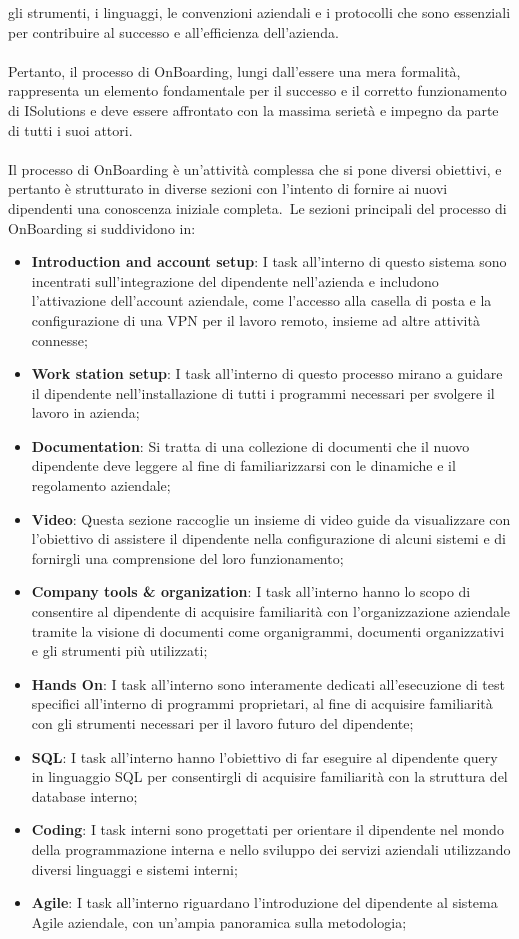gli strumenti, i linguaggi, le convenzioni aziendali e i protocolli che sono essenziali per contribuire al successo e 
all'efficienza dell'azienda.
\\ \\
Pertanto, il processo di OnBoarding, lungi dall'essere una mera formalità, rappresenta un elemento fondamentale per il successo 
e il corretto funzionamento di ISolutions e deve essere affrontato con la massima serietà e impegno da parte di tutti i suoi attori.
\\ \\
Il processo di OnBoarding è un'attività complessa che si pone diversi obiettivi, 
e pertanto è strutturato in diverse sezioni con l'intento di fornire ai nuovi 
dipendenti una conoscenza iniziale completa.\ Le sezioni principali del processo di OnBoarding si suddividono in:
\begin{itemize}
    \item \textbf{Introduction and account setup}: I task all'interno di questo sistema sono incentrati sull'integrazione del dipendente 
    nell'azienda e includono l'attivazione dell'account aziendale, come l'accesso alla casella di posta e la configurazione di una VPN per 
    il lavoro remoto, insieme ad altre attività connesse;
    \item \textbf{Work station setup}: I task all'interno di questo processo mirano a guidare il dipendente nell'installazione di tutti 
    i programmi necessari per svolgere il lavoro in azienda;
    \item \textbf{Documentation}: Si tratta di una collezione di documenti che il nuovo dipendente deve leggere al fine di familiarizzarsi 
    con le dinamiche e il regolamento aziendale;
    \item \textbf{Video}: Questa sezione raccoglie un insieme di video guide da visualizzare con l'obiettivo di assistere il dipendente 
    nella configurazione di alcuni sistemi e di fornirgli una comprensione del loro funzionamento;
    \item \textbf{Company tools \& organization}: I task all'interno hanno lo scopo di consentire al dipendente di acquisire familiarità con 
    l'organizzazione aziendale tramite la visione di documenti come organigrammi, documenti organizzativi e gli strumenti più utilizzati;
    \item \textbf{Hands On}: I task all'interno sono interamente dedicati all'esecuzione di test specifici all'interno di programmi 
    proprietari, al fine di acquisire familiarità con gli strumenti necessari per il lavoro futuro del dipendente;
    \item \textbf{SQL}: I task all'interno hanno l'obiettivo di far eseguire al dipendente query in linguaggio SQL per 
    consentirgli di acquisire familiarità con la struttura del database interno;
    \item \textbf{Coding}: I task interni sono progettati per orientare il dipendente nel mondo della programmazione interna 
    e nello sviluppo dei servizi aziendali utilizzando diversi linguaggi e sistemi interni;
    \item \textbf{Agile}: I task all'interno riguardano l'introduzione del dipendente al sistema Agile aziendale, 
    con un'ampia panoramica sulla metodologia; 
\end{itemize}
